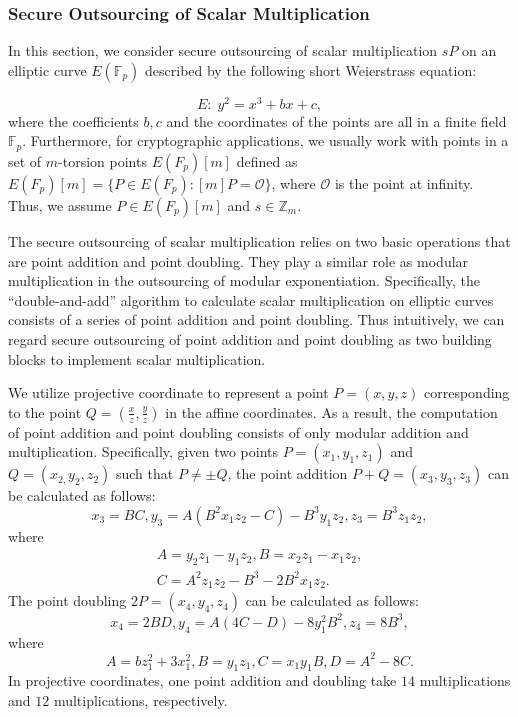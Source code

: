 \documentclass[english,draftcls,onecolumn,11pt]{IEEEtran}
\theoremstyle{definition}
\theoremstyle{plain}
\theoremstyle{plain}
\theoremstyle{definition}
\begin{document}
\subsubsection{Secure Outsourcing of Scalar Multiplication}

In this section, we consider secure outsourcing of scalar multiplication
$sP$ on an elliptic curve $E(\mathbb{F}_{p})$ described by the following
short Weierstrass equation: 

\begin{equation}
E:\;y^{2}=x^{3}+bx+c,\label{eq:Short}
\end{equation}
where the coefficients $b,c$ and the coordinates of the points are
all in a finite field $\mathbb{F}_{p}$. Furthermore, for cryptographic
applications, we usually work with points in a set of $m$-torsion
points $E(F_{p})[m]$ defined as $E(F_{p})[m]=\{P\in E(F_{p}):[m]P=\mathcal{O}\}$,
where $\mathcal{O}$ is the point at infinity. Thus, we assume $P\in E(F_{p})[m]$
and $s\in\mathbb{Z}_{m}$.

The secure outsourcing of scalar multiplication relies on two basic
operations that are point addition and point doubling. They play a
similar role as modular multiplication in the outsourcing of modular
exponentiation. Specifically, the ``double-and-add'' algorithm to
calculate scalar multiplication on elliptic curves consists of a series
of point addition and point doubling. Thus intuitively, we can regard
secure outsourcing of point addition and point doubling as two building
blocks to implement scalar multiplication.

We utilize projective coordinate to represent a point $P=(x,y,z)$
corresponding to the point $Q=\left(\frac{x}{z},\frac{y}{z}\right)$
in the affine coordinates. As a result, the computation of point addition
and point doubling consists of only modular addition and multiplication.
Specifically, given two points $P=(x_{1},y_{1},z_{1})$ and $Q=(x_{2,}y_{2},z_{2})$
such that $P\neq\pm Q$, the point addition $P+Q=(x_{3},y_{3},z_{3})$
can be calculated as follows:
\[
x_{3}=BC,y_{3}=A(B^{2}x_{1}z_{2}-C)-B^{3}y_{1}z_{2},z_{3}=B^{3}z_{1}z_{2},
\]
where 
\[
\begin{array}{l}
A=y_{2}z_{1}-y_{1}z_{2},B=x_{2}z_{1}-x_{1}z_{2},\\
C=A^{2}z_{1}z_{2}-B^{3}-2B^{2}x_{1}z_{2}.
\end{array}
\]
The point doubling $2P=(x_{4},y_{4},z_{4})$ can be calculated as
follows:
\[
x_{4}=2BD,y_{4}=A(4C-D)-8y_{1}^{2}B^{2},z_{4}=8B^{3},
\]
where 
\[
A=bz_{1}^{2}+3x_{1}^{2},B=y_{1}z_{1},C=x_{1}y_{1}B,D=A^{2}-8C.
\]
In projective coordinates, one point addition and doubling take $14$
multiplications and $12$ multiplications, respectively. 
\end{document}
